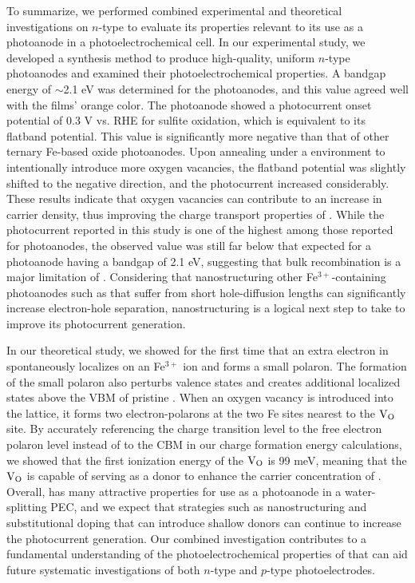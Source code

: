 To summarize, we performed combined experimental and theoretical investigations on $n$-type  to evaluate its properties relevant to its use as a photoanode in a photoelectrochemical cell. In our experimental study, we developed a synthesis method to produce high-quality, uniform $n$-type  photoanodes and examined their photoelectrochemical properties. A bandgap energy of $\sim$2.1 eV was determined for the  photoanodes, and this value agreed well with the films’ orange color. The  photoanode showed a photocurrent onset potential of 0.3 V vs. RHE for sulfite oxidation, which is equivalent to its flatband potential. This value is significantly more negative than that of other ternary Fe-based oxide photoanodes. Upon annealing under a  environment to intentionally introduce more oxygen vacancies, the flatband potential was slightly shifted to the negative direction, and the photocurrent increased considerably. These results indicate that oxygen vacancies can contribute to an increase in carrier density, thus improving the charge transport properties of . While the photocurrent reported in this study is one of the highest among those reported for  photoanodes, the observed value was still far below that expected for a photoanode having a bandgap of 2.1 eV, suggesting that bulk recombination is a major limitation of . Considering that nanostructuring other Fe$^{3+}$-containing photoanodes such as  that suffer from short hole-diffusion lengths can significantly increase electron-hole separation, nanostructuring  is a logical next step to take to improve its photocurrent generation.

In our theoretical study, we showed for the first time that an extra electron in  spontaneously localizes on an Fe$^{3+}$ ion and forms a small polaron. The formation of the small polaron also perturbs valence states and creates additional localized states above the VBM of pristine . When an oxygen vacancy is introduced into the  lattice, it forms two electron-polarons at the two Fe sites nearest to the $\rm V_O$ site. By accurately referencing the charge transition level to the free electron polaron level instead of to the CBM in our charge formation energy calculations, we showed that the first ionization energy of the $\rm V_O$ is 99 meV, meaning that the $\rm V_O$ is capable of serving as a donor to enhance the carrier concentration of .
Overall,  has many attractive properties for use as a photoanode in a water-splitting PEC, and we expect that strategies such as nanostructuring and substitutional doping that can introduce shallow donors can continue to increase the photocurrent generation. Our combined investigation contributes to a fundamental understanding of the photoelectrochemical properties of  that can aid future systematic investigations of both $n$-type and $p$-type  photoelectrodes.




